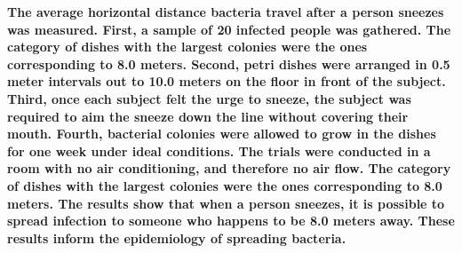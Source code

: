 \documentclass{article}
\begin{document}
\begin{enumerate}
\textbf{The average horizontal distance bacteria travel after a person sneezes was measured. First, a sample of 20 infected people was gathered.  The category of dishes with the largest colonies were the ones corresponding to 8.0 meters. Second, petri dishes were arranged in 0.5 meter intervals out to 10.0 meters on the floor in front of the subject.  Third, once each subject felt the urge to sneeze, the subject was required to aim the sneeze down the line without covering their mouth.  Fourth, bacterial colonies were allowed to grow in the dishes for one week under ideal conditions.  The trials were conducted in a room with no air conditioning, and therefore no air flow. The category of dishes with the largest colonies were the ones corresponding to 8.0 meters.   The results show that when a person sneezes, it is possible to spread infection to someone who happens to be 8.0 meters away.  These results inform the epidemiology of spreading bacteria.}
\end{enumerate}
\end{document}
